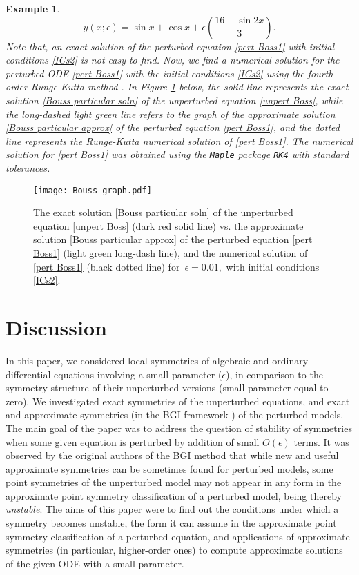 \documentclass[11pt,letter,subeqn]{article}
\newtheorem{example}{Example}[section]
\begin{document}
\begin{example}
        \begin{equation}\label{Bouss particular approx}
          y(x;\epsilon)=\sin x +\cos x +\epsilon \left(\frac{16-\sin 2x}{3}\right).
        \end{equation}
        Note that, an exact solution of the perturbed equation \eqref{pert Boss1} with initial conditions \eqref{ICs2} is not easy to find. Now, we find a numerical solution for the perturbed ODE \eqref{pert Boss1} with the initial conditions \eqref{ICs2} using the fourth-order Runge-Kutta method \cite{momoniat2010symmetry}. In Figure \ref{fig_sec7} below, the solid line represents the exact solution  \eqref{Bouss particular soln} of the unperturbed equation \eqref{unpert Boss}, while the long-dashed light green line refers to the graph of the approximate solution \eqref{Bouss particular approx} of the perturbed equation \eqref{pert Boss1}, and the dotted line represents the Runge-Kutta numerical solution of \eqref{pert Boss1}. The numerical solution for \eqref{pert Boss1} was obtained using the \verb"Maple" package \verb"RK4" with standard tolerances.
   \end{example}
   \begin{figure}[H]
	\centering
		\texttt{[image: Bouss\_graph.pdf]}
		\caption{The exact solution \eqref{Bouss particular soln} of the unperturbed equation \eqref{unpert Boss} (dark red solid line) vs. the approximate solution \eqref{Bouss particular approx} of the perturbed equation \eqref{pert Boss1} (light green long-dash line), and the numerical solution of \eqref{pert Boss1} (black dotted line) for \,$\epsilon=0.01,$ with initial conditions \eqref{ICs2}.}\label{fig_sec7}
\end{figure}

\section{Discussion}  \label{conclusion}

In this paper, we considered local symmetries of algebraic and ordinary differential equations involving a small parameter ($\epsilon$), in comparison to the symmetry structure of their unperturbed versions (small parameter equal to zero). We investigated exact symmetries of the unperturbed equations, and exact and approximate symmetries (in the BGI framework \cite{baikov1989, baikov1991, baikov1993}) of the perturbed models. The main goal of the paper was to address the question of stability of symmetries when some given equation is perturbed by addition of small $O(\epsilon)$ terms. It was observed by the original authors of the BGI method that while new and useful approximate symmetries can be sometimes found for perturbed models, some point symmetries of the unperturbed model may not appear in any form in the approximate point symmetry classification of a perturbed model, being thereby \emph{unstable}. The aims of this paper were to find out the conditions under which a symmetry becomes unstable, the form it can assume in the approximate point symmetry classification of a perturbed equation, and applications of approximate symmetries (in particular, higher-order ones) to compute approximate solutions of the given ODE with a small parameter.
\end{document}
